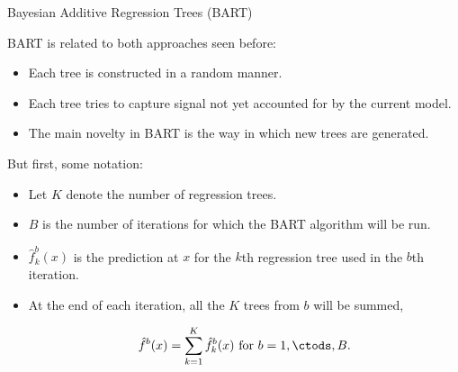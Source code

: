 \begin{frame}{Bayesian Additive Regression Trees (BART)}

BART is related to both approaches seen before: \pause 
\begin{itemize}
    \item Each tree is constructed in a random manner. \pause 

    \item Each tree tries to capture signal not yet accounted for by the current model. \pause 

    \item The main novelty in BART is the way in which new trees are generated. \pause 
\end{itemize}


But first, some notation: \pause 

\begin{itemize}
    \item Let $K$ denote the number of regression trees. \pause 

    \item $B$ is the number of iterations for which the BART algorithm will be run. \pause 

    \item $\hat{f}_k^b(x)$ is the prediction at $x$ for the $k$th regression tree used in the $b$th iteration. \pause 

    \item At the end of each iteration, all the $K$ trees from $b$ will be summed, 

    \begin{equation*}
        \hat{f}^b(x) = \sum_{k=1}^K \hat{f}_k^b(x) \text{ for } b= 1, \ctods , B. 
    \end{equation*}
\end{itemize}

    
\end{frame}


